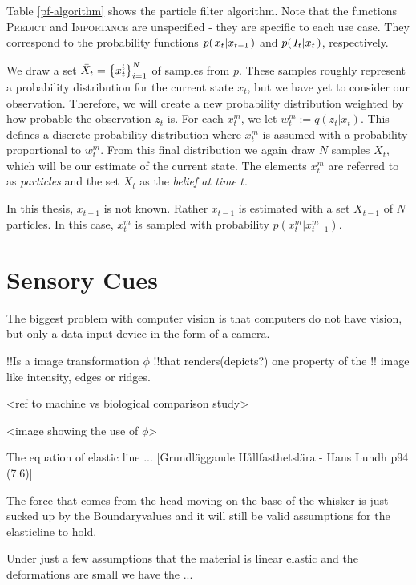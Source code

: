 Table \ref{pf-algorithm} shows the particle filter algorithm. Note that the functions \textsc{Predict} and \textsc{Importance} are unspecified - they are specific to each use case. They correspond to the probability functions $p{(\left. x_t \middle\vert x_{t-1} \right.)}$ and $p{(\left. I_t \middle\vert x_t \right.)}$, respectively.

We draw a set $\bar{X}_t = \left\{x_{t}^{i}\right\}_{i=1}^{N}$ of samples from $p$. These samples roughly represent a probability distribution for the current state $x_t$, but we have yet to consider our observation. Therefore, we will create a new probability distribution weighted by how probable the observation $z_t$ is. For each $x_t^m$, we let $w_t^m := q\left(z_t | x_t\right)$. This defines a discrete probability distribution where $x_t^m$ is assumed with a probability proportional to $w_t^m$. From this final distribution we again draw $N$ samples $X_t$, which will be our estimate of the current state. The elements $x_t^m$ are referred to as \emph{particles} and the set $X_t$ as the \emph{belief at time $t$}.

In this thesis, $x_{t-1}$ is not known. Rather $x_{t-1}$ is estimated with a set $X_{t-1}$ of $N$ particles. In this case, $x_t^m$ is sampled with probability $p\left(x_t^m | x_{t-1}^m\right)$.

\section{Sensory Cues}

The biggest problem with computer vision is that computers do not have
vision, but only a data input device in the form of a camera. 


!!Is a image transformation $\phi$ 
!!that renders(depicts?) one property of the
 !!   image like intensity, edges or ridges.

<ref to machine vs biological comparison study>


<image showing the use of $\phi$>



The equation of elastic line ... [Grundläggande Hållfasthetslära - Hans Lundh
p94 (7.6)]

The force that comes from the head moving on the base of the whisker is just 
sucked up by the Boundaryvalues and it will still be valid assumptions for the
elasticline to hold.

Under just a few assumptions that the material is linear elastic and the
deformations are small we have the ...



